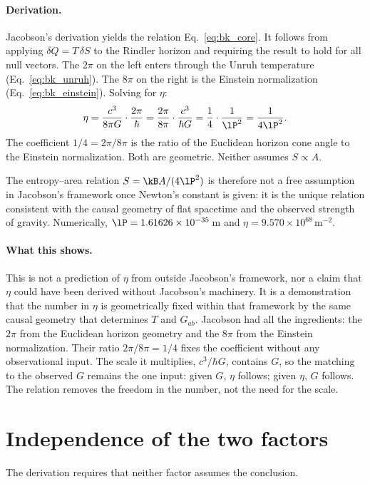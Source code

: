 \paragraph{Derivation.} Jacobson's derivation yields the relation Eq.~\eqref{eq:bk_core}. It follows from applying $\delta Q=T\,\delta S$ to the Rindler horizon and
requiring the result to hold for all null vectors. The $2\pi$ on the left enters through the Unruh temperature (Eq.~\eqref{eq:bk_unruh}). The $8\pi$ on the right is the
Einstein normalization (Eq.~\eqref{eq:bk_einstein}). Solving for $\eta$:
\begin{equation}
\eta=\frac{c^3}{8\pi G}\cdot\frac{2\pi}{\hbar}=\frac{2\pi}{8\pi}\cdot\frac{c^3}{\hbar G}=\frac14\cdot\frac{1}{\lP^2}=\frac{1}{4\lP^2}.\label{eq:bk_etasolve}
\end{equation}
The coefficient $1/4=2\pi/8\pi$ is the ratio of the Euclidean horizon cone angle to the Einstein normalization. Both are geometric. Neither assumes
$S\propto A$. \derived

The entropy--area relation $S=\kB A/(4\lP^2)$ is therefore not a free assumption in Jacobson's framework once Newton's constant is given: it is the unique
relation consistent with the causal geometry of flat spacetime and the observed strength of gravity. Numerically, $\lP=1.61626\times10^{-35}$\,m and
$\eta=9.570\times10^{68}$\,m$^{-2}$. \calc

\paragraph{What this shows.} This is not a prediction of $\eta$ from outside Jacobson's framework, nor a claim that $\eta$ could have been derived without
Jacobson's machinery. It is a demonstration that the number in $\eta$ is geometrically fixed within that framework by the same causal geometry that
determines $T$ and $G_{ab}$. Jacobson had all the ingredients: the $2\pi$ from the Euclidean horizon geometry and the $8\pi$ from the Einstein
normalization. Their ratio $2\pi/8\pi=1/4$ fixes the coefficient without any observational input. The scale it multiplies, $c^3/\hbar G$, contains $G$,
so the matching to the observed $G$ remains the one input: given $G$, $\eta$ follows; given $\eta$, $G$ follows. The relation removes the freedom in the
number, not the need for the scale. \interp

\section{Independence of the two factors}\label{sec:bk_independence}
The derivation requires that neither factor assumes the conclusion.

